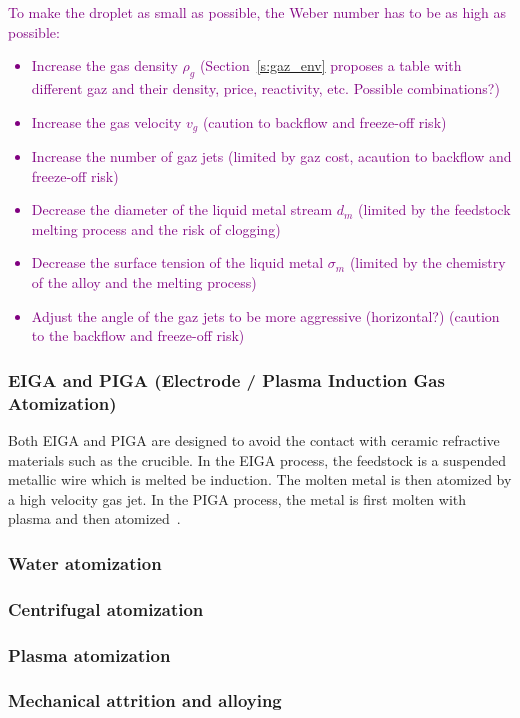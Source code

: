 \textcolor{Purple}{To make the droplet as small as possible, the Weber number has to be as high as possible:
\begin{itemize}
    \item Increase the gas density $\rho_g$ (Section~\ref{s:gaz_env} proposes a table with different gaz and their density, price, reactivity, etc. Possible combinations?)
    \item Increase the gas velocity $v_g$ (caution to backflow and freeze-off risk)
    \item Increase the number of gaz jets (limited by gaz cost, acaution to backflow and freeze-off risk)
    \item Decrease the diameter of the liquid metal stream $d_m$ (limited by the feedstock melting process and the risk of clogging)
    \item Decrease the surface tension of the liquid metal $\sigma_m$ (limited by the chemistry of the alloy and the melting process)
    \item Adjust the angle of the gaz jets to be more aggressive (horizontal?) (caution to the backflow and freeze-off risk)
\end{itemize}}

\subsubsection{EIGA and PIGA (Electrode / Plasma Induction Gas Atomization)}
Both EIGA and PIGA are designed to avoid the contact with ceramic refractive materials such as the crucible. In the EIGA process, the feedstock is a suspended metallic wire which is melted be induction. The molten metal is then atomized by a high velocity gas jet. In the PIGA process, the metal is first molten with plasma and then atomized~\cite{Kassym2020Atomizationprocesses}. 

\subsubsection{Water atomization}
\subsubsection{Centrifugal atomization}
\subsubsection{Plasma atomization}
\subsubsection{Mechanical attrition and alloying}
